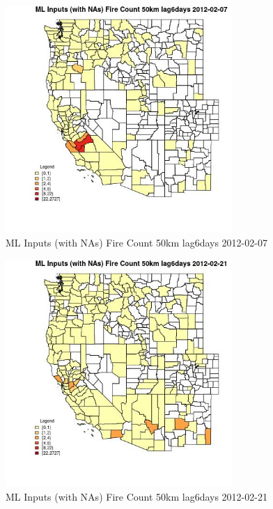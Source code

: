 \clearpage 

\begin{figure} 
\centering  
\includegraphics[width=0.77\textwidth]{Code_Outputs/Report_ML_input_PM25_Step4_part_f_de_duplicated_aves_prioritize_24hr_obswNAs_CountyFire_Count_50km_lag6daysMean2012-02-07.jpg} 
\caption{\label{fig:Report_ML_input_PM25_Step4_part_f_de_duplicated_aves_prioritize_24hr_obswNAsCountyFire_Count_50km_lag6daysMean2012-02-07}ML Inputs (with NAs) Fire Count 50km lag6days 2012-02-07} 
\end{figure} 
 

\begin{figure} 
\centering  
\includegraphics[width=0.77\textwidth]{Code_Outputs/Report_ML_input_PM25_Step4_part_f_de_duplicated_aves_prioritize_24hr_obswNAs_CountyFire_Count_50km_lag6daysMean2012-02-21.jpg} 
\caption{\label{fig:Report_ML_input_PM25_Step4_part_f_de_duplicated_aves_prioritize_24hr_obswNAsCountyFire_Count_50km_lag6daysMean2012-02-21}ML Inputs (with NAs) Fire Count 50km lag6days 2012-02-21} 
\end{figure} 
 

